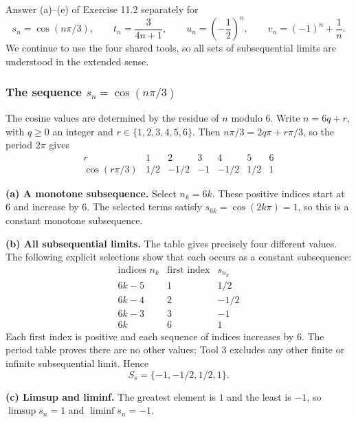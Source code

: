 

\goal Answer (a)--(e) of Exercise 11.2 separately for
\[
 s_n=\cos(n\pi/3),\qquad t_n=\frac3{4n+1},
 \qquad u_n=\left(-\frac12\right)^n,
 \qquad v_n=(-1)^n+\frac1n.
\]
We continue to use the four shared tools, so all sets of
subsequential limits are understood in the extended sense.

\subsubsection*{The sequence $s_n=\cos(n\pi/3)$}

The cosine values are determined by the residue of $n$
modulo $6$. Write $n=6q+r$, with $q\geq0$ an integer
and $r\in\{1,2,3,4,5,6\}$. Then
$n\pi/3=2q\pi+r\pi/3$, so the period $2\pi$ gives
\[
\begin{array}{c|rrrrrr}
 r&1&2&3&4&5&6\\ \hline
 \cos(r\pi/3)&1/2&-1/2&-1&-1/2&1/2&1
\end{array}
\]

\textbf{(a) A monotone subsequence.}
Select $n_k=6k$. These positive indices start at $6$ and
increase by $6$. The selected terms satisfy
$s_{6k}=\cos(2k\pi)=1$, so this is a constant monotone
subsequence.

\textbf{(b) All subsequential limits.}
The table gives precisely four different values. The following
explicit selections show that each occurs as a constant
subsequence:
\[
\begin{array}{c|c|c}
 \text{indices }n_k&\text{first index}&s_{n_k}\\ \hline
 6k-5&1&1/2\\
 6k-4&2&-1/2\\
 6k-3&3&-1\\
 6k&6&1
\end{array}
\]
Each first index is positive and each sequence of indices
increases by $6$. The period table proves there are no
other values; Tool 3 excludes any other finite or infinite
subsequential limit. Hence
\[
 S_s=\{-1,-1/2,1/2,1\}.
\]

\textbf{(c) Limsup and liminf.}
The greatest element is $1$ and the least is $-1$, so
$\limsup s_n=1$ and $\liminf s_n=-1$.

